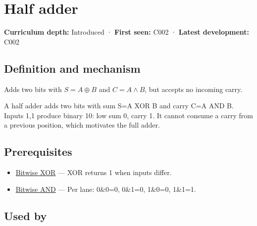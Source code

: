 \hypertarget{appendix-1652d27a8e90}{}\label{referencestart:appendix-1652d27a8e90}
\section{Half adder}\label{appendix-1652d27a8e90-half-adder}

\hypertarget{appendix-1652d27a8e90-half-adder}{}

\textbf{Curriculum depth:} Introduced · \textbf{First seen:} C002 · \textbf{Latest development:} C002

\begin{allmightroledefinition}

\subsection{Definition and mechanism}\label{appendix-1652d27a8e90-definition-and-mechanism}

\hypertarget{appendix-1652d27a8e90-definition-and-mechanism}{}

Adds two bits with \(S=A\oplus B\) and \(C=A\land B\), but accepts no incoming carry.

\end{allmightroledefinition}

A half adder adds two bits with sum S=A XOR B and carry C=A AND B. Inputs 1,1 produce binary 10: low sum 0, carry 1. It cannot consume a carry from a previous position, which motivates the full adder.

\subsection{Prerequisites}\label{appendix-1652d27a8e90-prerequisites}

\hypertarget{appendix-1652d27a8e90-prerequisites}{}

\begin{itemize}
\tightlist
\item
  \hyperref[appendix-d49161831368]{Bitwise XOR} --- XOR returns 1 when inputs differ.
\item
  \hyperref[appendix-68b52453737c]{Bitwise AND} --- Per lane: 0\&0=0, 0\&1=0, 1\&0=0, 1\&1=1.
\end{itemize}

\subsection{Used by}\label{appendix-1652d27a8e90-used-by}

